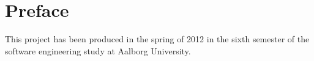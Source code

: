 \chapter*{Preface}
This project has been produced in the spring of 2012 in the sixth semester of the software engineering study at Aalborg University.